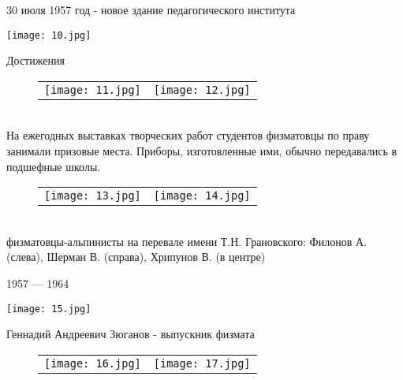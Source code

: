 \documentclass[pdf,hyperref={unicode}, aspectratio=43, serif,11pt]{beamer}
\begin{document}
\begin{frame}{30 июля 1957 год - новое здание педагогического института}
    \begin{center}
        \texttt{[image: 10.jpg]}
    \end{center}
\end{frame}
\begin{frame}{Достижения}
    \begin{figure}[h]
        \begin{tabular}{ll}
            \texttt{[image: 11.jpg]}
            &
            \texttt{[image: 12.jpg]}
        \end{tabular}
        \label{Fig:Race}
    \end{figure} \\
    На ежегодных выставках творческих работ студентов физматовцы по праву занимали призовые места. Приборы, изготовленные ими, обычно передавались в подшефные школы.
\end{frame}
\begin{frame}
    \begin{figure}[h]
        \begin{tabular}{ll}
            \texttt{[image: 13.jpg]}
            &
            \texttt{[image: 14.jpg]}
        \end{tabular}
        \label{Fig:Race}
    \end{figure} \\
    физматовцы-альпинисты на перевале имени Т.Н. Грановского: Филонов А. (слева), Шерман В. (справа), Хрипунов В. (в центре)
\end{frame}
\begin{frame}{1957 — 1964}
    \begin{center}
        \texttt{[image: 15.jpg]} \\
        \caption{Александров Василий Александрович - декан физмата}
    \end{center}
\end{frame}
\begin{frame}{Геннадий Андреевич Зюганов - выпускник физмата}
    \begin{figure}[h]
        \begin{tabular}{ll}
            \texttt{[image: 16.jpg]}
            &
            \texttt{[image: 17.jpg]}
        \end{tabular}
        \label{Fig:Race}
    \end{figure}
\end{frame}
\end{document}
